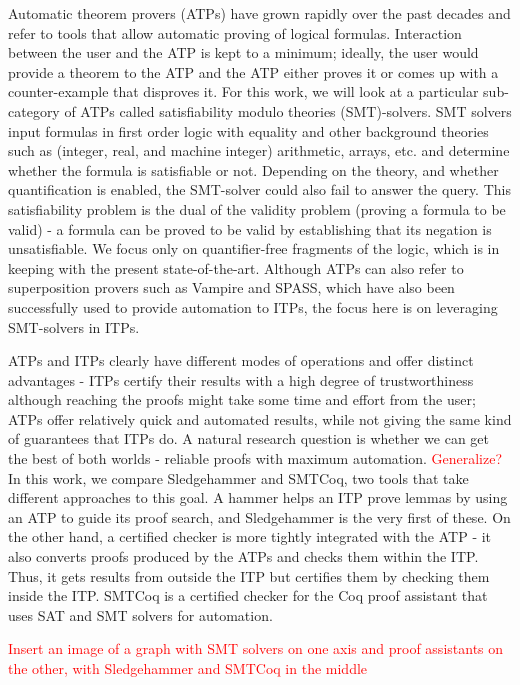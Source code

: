 \documentclass{article}
\begin{document}
	Automatic theorem provers (ATPs) have grown rapidly over the 
	past decades and refer to tools that allow automatic proving 
	of logical formulas. Interaction between the user and the 
	ATP is kept to a minimum; ideally, the user would provide a 
	theorem to the ATP and the ATP either proves it or comes up
	with a counter-example that disproves it. For this work, we 
	will look at a particular sub-category of ATPs called 
	satisfiability modulo theories (SMT)-solvers. SMT solvers 
	input formulas in first order logic with equality and 
	other background theories such as (integer, real, and 
	machine integer) arithmetic, arrays, etc. and determine
	whether the formula is satisfiable or not. Depending 
	on the theory, and whether quantification
	is enabled, the SMT-solver could also fail to answer the query. 
	This satisfiability problem is the dual of the 
	validity problem (proving a formula to be valid) - a 
	formula can be proved to be valid by establishing that 
	its negation is unsatisfiable. We focus only on 
	quantifier-free fragments of the logic, which is in keeping 
	with the present state-of-the-art. Although ATPs can also 
	refer to superposition provers such as Vampire and SPASS, 
	which have also been successfully used to provide 
	automation to ITPs, the focus here is on leveraging 
	SMT-solvers in ITPs.
	
	ATPs and ITPs clearly have different modes of operations
	and offer distinct advantages - ITPs certify their 
	results with a high degree of trustworthiness although 
	reaching the proofs might take some time and effort from 
	the user; ATPs offer relatively quick and automated results, 
	while not giving the same kind of guarantees that ITPs do.
	A natural research question is whether we can get the best 
	of both worlds - reliable proofs with maximum automation. 
	\textcolor{red}{Generalize?}
	In this work, we compare Sledgehammer and SMTCoq, 
	two tools that take different approaches 
	to this goal. A hammer helps an ITP prove lemmas by using 
	an ATP to guide its proof search, and Sledgehammer is
	the very first of these. On the other hand, 
	a certified checker is more tightly integrated with the ATP 
	- it also converts proofs produced by the ATPs and 
	checks them within the ITP. Thus, it gets results 
	from outside the ITP but certifies them by checking them
	inside the ITP. SMTCoq is a certified checker 
	for the Coq proof assistant that uses SAT and SMT solvers
	for automation.
	
	\textcolor{red}{Insert an image of a graph with SMT solvers
	on one axis and proof assistants on the other, with
	Sledgehammer and SMTCoq in the middle}
\end{document}
